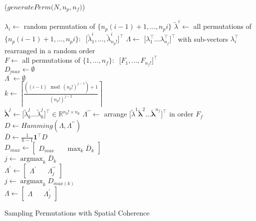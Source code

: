 \documentclass[10pt,twocolumn,letterpaper]{article}
\begin{document}
\begin{algorithm}[ht]
\DontPrintSemicolon
{}
\Begin($\textit{generatePerm} {(} N,n_p,n_f {)}$)
{
  {
    $\lambda_{i} \leftarrow$ random permutation of $\{ n_p (i-1)+1,\dots , n_p i \}$\;
    $\tilde{\lambda}^{i} \leftarrow$ all permutations of $\{ n_p (i-1)+1,\dots , n_p i \}:\;\; \lbrack \tilde{\lambda}_{1}^{i}, \dots, \tilde{\lambda}_{n_p!}^{i} \rbrack ^\top  $\;
  }\label{endfor}
  $\Lambda \leftarrow$ $\lbrack \lambda_{1}^{\top} \dots \lambda_{n_f}^{\top} \rbrack^\top$ with sub-vectors $\lambda_i^\top$ rearranged in a random order\\
  $F \leftarrow$ all permutations of $\{ 1, \dots, n_f \}:\;\; \lbrack F_{1}, \dots, F_{n_f!} \rbrack^\top$  \\
    {
     $D_{max} \leftarrow \emptyset$ \\
     $\Lambda^\prime \leftarrow \emptyset$ \\
      {
	{
	  {
	    $k \leftarrow \left\lceil\frac{\left( \left(i-1\right) \mod \left(n_p! \right)^{j-1} \right)+1}{\left(n_p! \right)^{j-2}}\right\rceil$ \\
	    $\underset{\overline{}}{\tilde{\boldsymbol\lambda}}^{j} \leftarrow \lbrack \tilde{\lambda}_{k}^{j} \dots \tilde{\lambda}_{k}^{j} \rbrack^\top \in \mathbb{R}^{n_p!\times n_p}$
	  }
	  $\Lambda^{\prime\prime} \leftarrow$ arrange $\lbrack\tilde{\lambda}^1 \underset{\overline{}}{\tilde{\boldsymbol\lambda}^2} \dots \underset{\overline{}}{\tilde{\boldsymbol\lambda}^{n_f}} \rbrack^\top$ in order $F_f$ \\
	  $D \leftarrow Hamming(\Lambda,\Lambda^{\prime\prime})$ \\
	  $\overline{D} \leftarrow \frac{1}{h-1}\mathbf{1}^\top D$ \\
	  $D_{max} \leftarrow \begin{bmatrix} D_{max} && \max_{k}\overline{D}_k \end{bmatrix}$ \\
	  $j \leftarrow \operatorname*{argmax}_k \overline{D}_k$ \\
	  $\Lambda^{\prime} \leftarrow \begin{bmatrix} \Lambda^{\prime} && \Lambda^{\prime\prime}_j \end{bmatrix}$ \\
	}
      }
      $j \leftarrow \operatorname*{argmax}_k D_{max(k)}$ \\
      $\Lambda \leftarrow \begin{bmatrix} \Lambda && \Lambda_{j}^{\prime}\end{bmatrix}$
    }
  
  \Return{$\Lambda$}
}
\caption{Sampling Permutations with Spatial Coherence}\label{algo1}
\end{algorithm}
\end{document}
